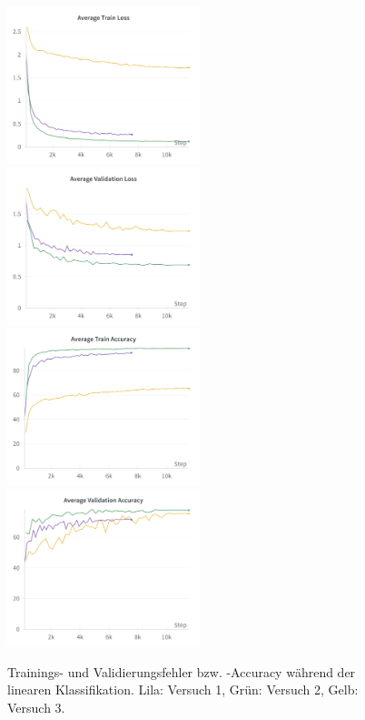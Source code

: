 \begin{figure}
	\centering
	\includegraphics[width=0.5\textwidth]{figure_results_supcon-lin_avg-train-loss.png}%
	\includegraphics[width=0.5\textwidth]{figure_results_supcon-lin_avg-val-loss.png}
	\includegraphics[width=0.5\textwidth]{figure_results_supcon-lin_avg-train-acc.png}%
	\includegraphics[width=0.5\textwidth]{figure_results_supcon-lin_avg-val-acc.png}
	\caption[Trainings- und Validierungsfehler bzw. -Accuracy während der linearen Klassifikation.]{Trainings- und Validierungsfehler bzw. -Accuracy während der linearen Klassifikation. \textcolor{exp1}{Lila}: Versuch 1, \textcolor{exp2}{Grün}: Versuch 2, \textcolor{exp3}{Gelb}: Versuch 3.}
	\label{fig:supcon-lin-loss-acc}
\end{figure}
